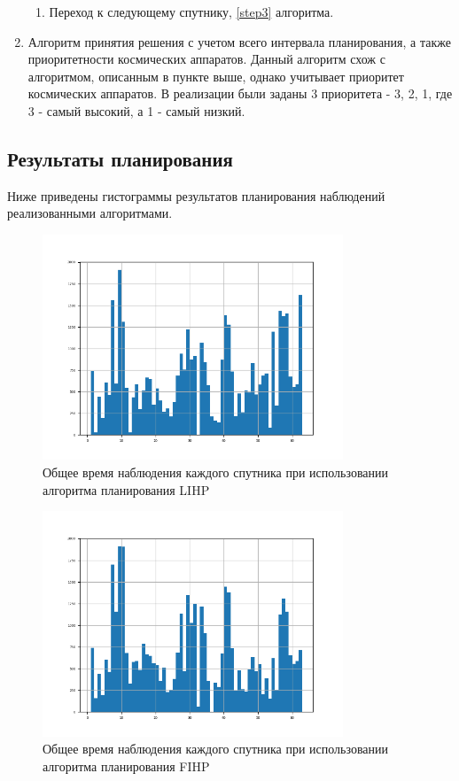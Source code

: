 \begin{enumerate}
\begin{enumerate}
		\item Переход к следующему спутнику, \ref{step3} алгоритма.\label{step6}
	\end{enumerate}
	\item Алгоритм принятия решения с учетом всего интервала планирования, а также приоритетности космических аппаратов. Данный алгоритм схож с алгоритмом, описанным в пункте выше, однако учитывает приоритет космических аппаратов. В реализации были заданы 3 приоритета - 3, 2, 1, где 3 - самый высокий, а 1 - самый низкий.
\end{enumerate}

\subsection{Результаты планирования}

Ниже приведены гистограммы результатов планирования наблюдений реализованными алгоритмами.

\begin{figure}[H]
	\centering
	\includegraphics[width=0.8\textwidth]{assets/LIHP.png}
	\caption{Общее время наблюдения каждого спутника при использовании алгоритма планирования LIHP}
\end{figure}

\begin{figure}[H]
	\centering
	\includegraphics[width=0.8\textwidth]{assets/FIHP.png}
	\caption{Общее время наблюдения каждого спутника при использовании алгоритма планирования FIHP}
\end{figure}

